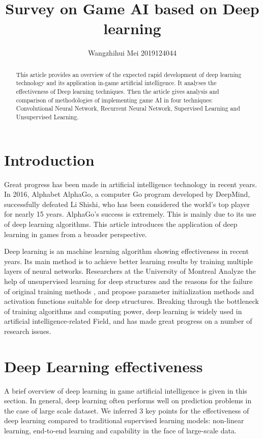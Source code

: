 \documentclass[11pt,en]{elegantpaper}
\title{Survey on Game AI based on Deep learning}
\author{Wangzhihui Mei 2019124044}
\institute{CCNU-UOW JI}
\date{}
\begin{document}
\maketitle

\begin{abstract}
	This article provides an overview of the expected rapid development of deep learning technology and its application in-game artificial intelligence. It analyses the effectiveness of Deep learning techniques. Then the article gives analysis and comparison of methodologies of implementing game AI in four techniques: Convolutional Neural Network, Recurrent Neural Network, Supervised Learning and Unsupervised Learning. 	
\end{abstract}

\section{Introduction}
Great progress has been made in artificial intelligence technology in recent years. In 2016, Alphabet AlphaGo, a computer Go program developed by DeepMind, successfully defeated Li Shishi, who has been considered the world's top player for nearly 15 years. AlphaGo's success is extremely. This is mainly due to its use of deep learning algorithms\cite{Justesen2019}. This article introduces the application of deep learning in games from a broader perspective.
 
Deep learning is an machine learning algorithm showing effectiveness in recent years\cite{Sironi2018}. Its main method is to achieve better learning results by training multiple layers of neural networks. Researchers at the University of Montreal Analyze the help of unsupervised learning for deep structures \cite{9} and the reasons for the failure of original training methods \cite{10}, and propose parameter initialization methods and activation functions \cite{11} suitable for deep structures. Breaking through the bottleneck of training algorithms and computing power, deep learning is widely used in artificial intelligence-related Field\cite{Mendes2016,Togelius2016}, and has made great progress on a number of research issues. 

\section{Deep Learning effectiveness}
A brief overview of deep learning in game artificial intelligence is given in this section. In general, deep learning often performs well on prediction problems in the case of large scale dataset. We inferred 3 key points for the effectiveness of deep learning compared to traditional supervised learning models: non-linear learning, end-to-end learning and capability in the face of large-scale data.
\end{document}
